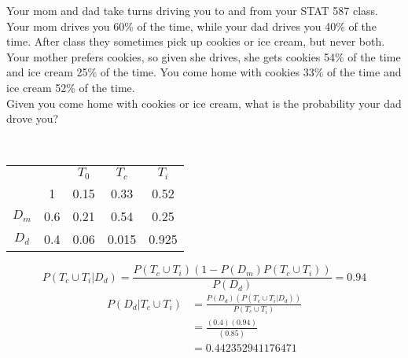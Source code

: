 \documentclass[answers]{exam}
\begin{document}
\begin{questions}
\question 
Your mom and dad take turns driving you to and from your STAT 587 class. Your mom drives you 60\% of the time, while your dad drives you 40\% of the time. After class they sometimes pick up cookies or ice cream, but never both. Your mother prefers cookies, so given she drives, she gets cookies 54\% of the time and ice cream 25\% of the time. You come home with cookies 33\% of the time and ice cream 52\% of the time. \\
Given you come home with cookies or ice cream, what is the probability your dad drove you?
\begin{solution} \\
	\begin{tabular}{cc|ccc}
		&  & $T_0$ & $T_c$ & $T_i$ \\
		& 1 & 0.15 & 0.33 & 0.52 \\
		\hline
		$D_m$ & 0.6 & 0.21 & 0.54 & 0.25 \\
		$D_d$ & 0.4 & 0.06 & 0.015 & 0.925 \\
		\hline
	\end{tabular}
	\begin{equation*}
		P(T_c\cup T_i|D_d) = \frac{P(T_c\cup T_i)(1-P(D_m)P(T_c\cup T_i))}{P(D_d)}
		= 0.94
	\end{equation*}
	\begin{align*}
		P(D_d|T_c\cup T_i) &= \frac{P(D_d)(P(T_c\cup T_i|D_d))}{P(T_c\cup T_i)} \\
		&= \frac{(0.4)(0.94)}{(0.85)} \\
		&= 0.442352941176471
	\end{align*}
		
\end{solution}


\end{questions}
\end{document}
